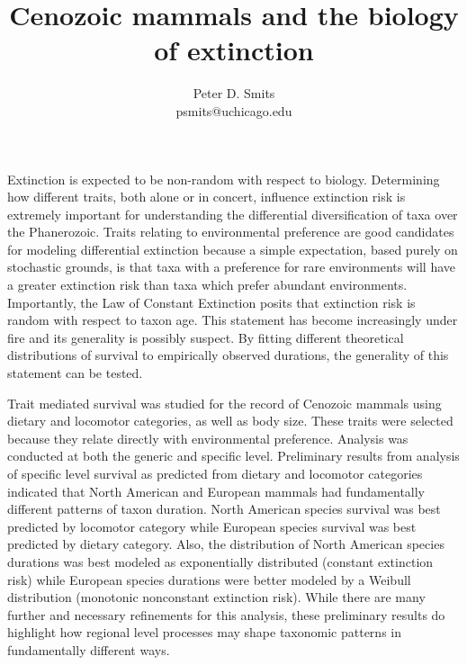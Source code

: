 \documentclass{article}
\title{Cenozoic mammals and the biology of extinction}
\author{Peter D. Smits\\ psmits@uchicago.edu}
\begin{document}
\maketitle

Extinction is expected to be non-random with respect to biology. Determining how different traits, both alone or in concert, influence extinction risk is extremely important for understanding the differential diversification of taxa over the Phanerozoic. Traits relating to environmental preference are good candidates for modeling differential extinction because a simple expectation, based purely on stochastic grounds, is that taxa with a preference for rare environments will have a greater extinction risk than taxa which prefer abundant environments. Importantly, the Law of Constant Extinction posits that extinction risk is random with respect to taxon age. This statement has become increasingly under fire and its generality is possibly suspect. By fitting different theoretical distributions of survival to empirically observed durations, the generality of this statement can be tested. 

Trait mediated survival was studied for the record of Cenozoic mammals using dietary and locomotor categories, as well as body size. These traits were selected because they relate directly with environmental preference. Analysis was conducted at both the generic and specific level. Preliminary results from analysis of specific level survival as predicted from dietary and locomotor categories indicated that North American and European mammals had fundamentally different patterns of taxon duration. North American species survival was best predicted by locomotor category while European species survival was best predicted by dietary category. Also, the distribution of North American species durations was best modeled as exponentially distributed (constant extinction risk) while European species durations were better modeled by a Weibull distribution (monotonic nonconstant extinction risk). While there are many further and necessary refinements for this analysis, these preliminary results do highlight how regional level processes may shape taxonomic patterns in fundamentally different ways.  
\end{document}
